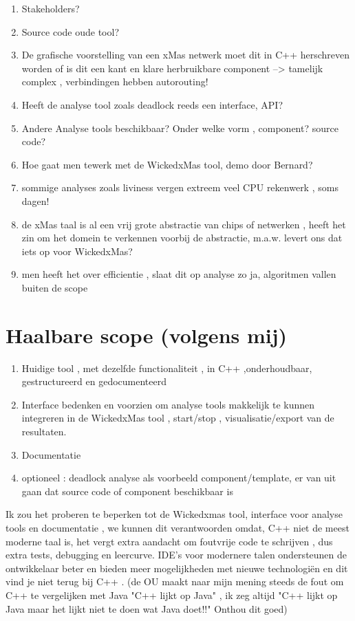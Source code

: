 \documentclass[a4paper]{article}
\begin{document}
\begin{enumerate}
\item Stakeholders?
\item Source code oude tool?
\item De grafische voorstelling van een xMas netwerk moet dit in C++ herschreven worden of is dit een kant en klare herbruikbare component --> tamelijk complex , verbindingen hebben autorouting!
\item Heeft de analyse tool zoals deadlock reeds een interface, API? 
\item Andere Analyse tools beschikbaar? Onder welke vorm , component? source code?
\item Hoe gaat men tewerk met de WickedxMas tool, demo door Bernard? 
\item sommige analyses zoals liviness vergen extreem veel CPU rekenwerk , soms dagen!
\item de xMas taal is al een vrij grote abstractie van chips of netwerken , heeft het zin om het domein te verkennen voorbij de abstractie, m.a.w. levert ons dat iets op voor WickedxMas?
\item men heeft het over efficientie , slaat dit op analyse zo ja, algoritmen vallen buiten de scope
\end{enumerate}


\section{Haalbare scope (volgens mij)}

\begin{enumerate}
\item Huidige tool , met dezelfde functionaliteit , in C++ ,onderhoudbaar, gestructureerd en gedocumenteerd
\item Interface bedenken en voorzien om analyse tools makkelijk te kunnen integreren in de WickedxMas tool , start/stop , visualisatie/export van de resultaten.
\item Documentatie
\item optioneel : deadlock analyse als voorbeeld component/template, er van uit gaan dat source code of component beschikbaar is
\end{enumerate}

Ik zou het proberen te beperken tot de Wickedxmas tool, interface voor analyse tools en documentatie , we kunnen dit verantwoorden omdat,
C++ niet de meest moderne taal is, het vergt extra aandacht om foutvrije code te schrijven , dus extra tests, debugging en leercurve. IDE's voor modernere talen ondersteunen de ontwikkelaar beter en bieden meer mogelijkheden met nieuwe technologiën en dit vind je niet terug bij C++ . (de OU maakt naar mijn mening steeds de fout om C++ te vergelijken met Java "C++ lijkt op Java" , ik zeg altijd "C++ lijkt op Java maar het lijkt niet te doen wat Java doet!!" Onthou dit goed)
 
\end{document}
